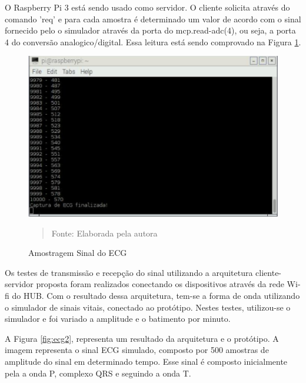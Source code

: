 \documentclass[12pt, a4paper]{article}
\begin{document}
\hspace*{0.8cm}O Raspberry Pi 3 está sendo usado como servidor. O cliente solicita através do comando 'req' e para cada amostra é determinado um valor de acordo com o sinal fornecido pelo o simulador através da porta do mcp.read-adc(4), ou seja, a porta 4 do conversão analogico/digital. Essa leitura está sendo comprovado na Figura \ref{fig:kiki}.

\begin{figure}[H]
\begin{center}
			\caption{Amostragem Sinal do ECG}
			\includegraphics[width=.9\textwidth]{Figuras/json.PNG}
			              						\vspace*{\fill} 
            \begin{quote} 
            \centering 
           Fonte: Elaborada pela autora
            \end{quote}
            \vspace*{\fill}
			\label{fig:kiki}
\end{center}
\end{figure}

Os testes de transmissão e recepção do sinal utilizando a arquitetura cliente-servidor proposta foram realizados conectando os dispositivos através da rede Wi-fi do HUB. Com o resultado dessa arquitetura, tem-se a forma de onda utilizando o simulador de sinais vitais, conectado ao protótipo. Nestes testes, utilizou-se o simulador e foi variado a amplitude e o batimento por minuto.

A Figura \ref{fig:ecg2}, representa um resultado da arquitetura e o protótipo. A imagem representa o sinal ECG simulado, composto por 500 amostras de amplitude do sinal em determinado tempo. Esse sinal é composto inicialmente pela a onda P, complexo QRS e seguindo a onda T. 
\end{document}
